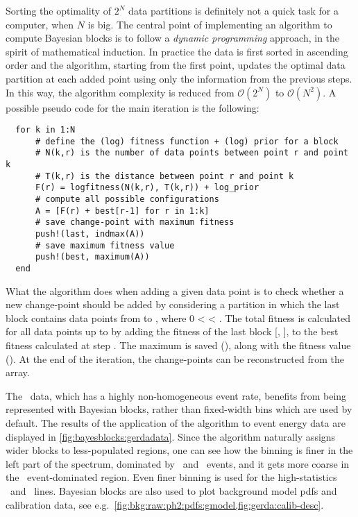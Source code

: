 Sorting the optimality of $2^N$ data partitions is definitely not a quick task for a
computer, when $N$ is big. The central point of implementing an algorithm to compute
Bayesian blocks is to follow a \emph{dynamic programming} approach, in the spirit of
mathematical induction. In practice the data is first sorted in ascending order and the
algorithm, starting from the first point, updates the optimal data partition at each added
point using only the information from the previous steps. In this way, the algorithm
complexity is reduced from $\mathcal{O}(2^N)$ to $\mathcal{O}(N^2)$. A possible pseudo
code for the main iteration is the following:
\begin{lstlisting}
  for k in 1:N
      # define the (log) fitness function + (log) prior for a block
      # N(k,r) is the number of data points between point r and point k
      # T(k,r) is the distance between point r and point k
      F(r) = logfitness(N(k,r), T(k,r)) + log_prior
      # compute all possible configurations
      A = [F(r) + best[r-1] for r in 1:k]
      # save change-point with maximum fitness
      push!(last, indmax(A))
      # save maximum fitness value
      push!(best, maximum(A))
  end
\end{lstlisting}
What the algorithm does when adding a given data point  is to check whether a new
change-point should be added by considering a partition in which the last block contains
data points from  to , where 0 <  < . The total fitness is calculated
for all data points up to  by adding the fitness of the last block [, ], to
the best fitness calculated at step . The maximum is saved (), along with the
fitness value (). At the end of the iteration, the change-points can be
reconstructed from the  array.

The \gerda\ data, which has a highly non-homogeneous event rate, benefits from being
represented with Bayesian blocks, rather than fixed-width bins which are used by default.
The results of the application of the algorithm to event energy data are displayed in
\cref{fig:bayesblocks:gerdadata}. Since the algorithm naturally assigns wider blocks to
less-populated regions, one can see how the binning is finer in the left part of the
spectrum, dominated by \Arl\ and \nnbb\ events, and it gets more coarse in the \a\
event-dominated region. Even finer binning is used for the high-statistics \kvn\ and \kvz\
lines. Bayesian blocks are also used to plot background model pdfs and calibration data,
see e.g.~\cref{fig:bkg:raw:ph2:pdfs:gmodel,fig:gerda:calib-desc}.

